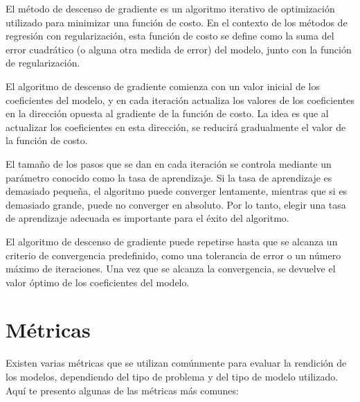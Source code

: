 \documentclass[
  letterpaper,
  DIV=11,
  numbers=noendperiod]{scrartcl}
\begin{document}
El método de descenso de gradiente es un algoritmo iterativo de
optimización utilizado para minimizar una función de costo. En el
contexto de los métodos de regresión con regularización, esta función de
costo se define como la suma del error cuadrático (o alguna otra medida
de error) del modelo, junto con la función de regularización.

El algoritmo de descenso de gradiente comienza con un valor inicial de
los coeficientes del modelo, y en cada iteración actualiza los valores
de los coeficientes en la dirección opuesta al gradiente de la función
de costo. La idea es que al actualizar los coeficientes en esta
dirección, se reducirá gradualmente el valor de la función de costo.

El tamaño de los pasos que se dan en cada iteración se controla mediante
un parámetro conocido como la tasa de aprendizaje. Si la tasa de
aprendizaje es demasiado pequeña, el algoritmo puede converger
lentamente, mientras que si es demasiado grande, puede no converger en
absoluto. Por lo tanto, elegir una tasa de aprendizaje adecuada es
importante para el éxito del algoritmo.

El algoritmo de descenso de gradiente puede repetirse hasta que se
alcanza un criterio de convergencia predefinido, como una tolerancia de
error o un número máximo de iteraciones. Una vez que se alcanza la
convergencia, se devuelve el valor óptimo de los coeficientes del
modelo.

\hypertarget{muxe9tricas}{%
\section{Métricas}\label{muxe9tricas}}

Existen varias métricas que se utilizan comúnmente para evaluar la
rendición de los modelos, dependiendo del tipo de problema y del tipo de
modelo utilizado. Aquí te presento algunas de las métricas más comunes:
\end{document}
